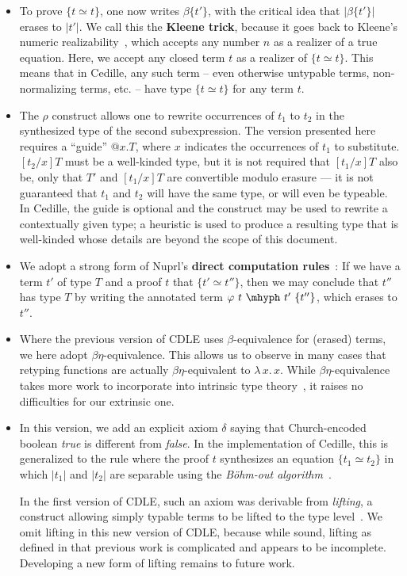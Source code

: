 \documentclass{article}
\newcommand{\absu}[3]{{#1}\, #2.\, #3}
\begin{document}
\begin{itemize}
\item To prove $\{ t \simeq t\}$, one now writes $\beta\{t'\}$,
  with the critical idea that $|\beta\{t'\}|$ erases to $|t'|$.  We call this the \textbf{Kleene trick},
  because it goes back to Kleene's numeric
  realizability~\cite{Kle65_Classical-Extensions-of-Intuitionistic-Mathematics},
  which accepts any number $n$ as a realizer 
  of a true equation.  Here, we accept any closed term $t$ as a realizer
  of $\{ t \simeq t\}$.  This means that in Cedille, any such term -- even otherwise untypable
  terms, non-normalizing terms, etc. -- have type $\{ t \simeq t\}$ for any term
  $t$.
\item The \(\rho\) construct allows one to rewrite occurrences of \(t_1\) to
  \(t_2\) in the synthesized type of the second subexpression.
  The version presented here requires a ``guide'' \(@x.T\), where \(x\)
  indicates the occurrences of \(t_1\) to substitute.
  \([t_2/x]T\) must be a well-kinded type, but it is not required that
  \([t_1/x]T\) also be, only that \(T'\) and \([t_1/x]T\) are convertible modulo
  erasure --- it is not guaranteed that \(t_1\) and \(t_2\) will have the same
  type, or will even be typeable.
  In Cedille, the guide is optional and the construct may be used to rewrite a
  contextually given type; a heuristic is used to produce a resulting type that
  is well-kinded whose details are beyond the scope of this document.
\item We adopt a strong form of Nuprl's \textbf{direct computation rules}~\cite{constable+86}:
  If we have a term $t'$ of type $T$ and a proof $t$ that $\{ t' \simeq t''\}$, then we may conclude that
  $t''$ has type $T$ by writing the annotated term $\varphi\ t\ \mhyph\ t'\ \{t''\}$, which
  erases to $t''$.
\item Where the previous version of CDLE uses $\beta$-equivalence for (erased) terms, we here adopt $\beta\eta$-equivalence.  This
  allows us to observe in many cases that retyping functions are actually $\beta\eta$-equivalent to $\absu{\lambda}{x}{x}$.
  While $\beta\eta$-equivalence takes more work to incorporate into intrinsic 
  type theory~\cite{geuvers92},
  it raises no difficulties for our extrinsic one.
\item In this version, we add an explicit axiom $\delta$ saying that Church-encoded boolean \emph{true} is different from
  \emph{false}.
  In the implementation of Cedille, this is generalized to the rule where the
  proof \(t\) synthesizes an equation \(\{t_1 \simeq t_2\}\) in which \(|t_1|\)
  and \(|t_2|\) are separable using the \emph{B\"ohm-out algorithm}~\cite{BDPR79_Bohm-Algorithm}.

  In the first version of CDLE, such an axiom was derivable from \emph{lifting}, a construct allowing
  simply typable terms to be lifted to the type level~\cite{stump17}.  We omit lifting in this new version of CDLE, because while
  sound, lifting as defined in that previous work is complicated and appears to be incomplete.  Developing a new
  form of lifting remains to future work.
\end{itemize}
\end{document}
